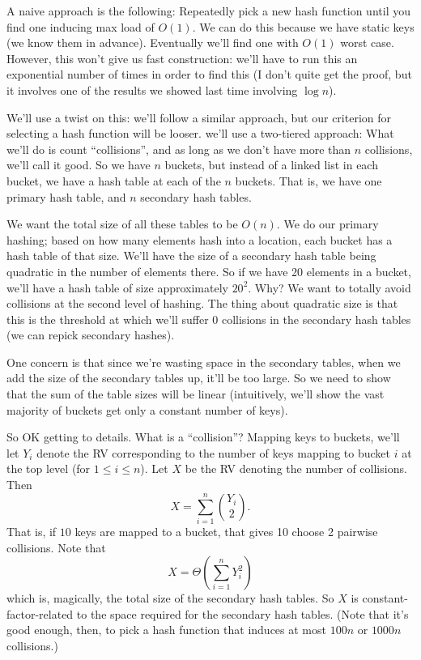 \documentclass{article}
\begin{document}
A naive approach is the following: Repeatedly pick a new hash function
until you find one inducing max load of $O(1)$.
We can do this because we have static keys (we know them in advance).
Eventually we'll find one with $O(1)$ worst case.
However, this won't give us fast construction:
we'll have to run this an exponential number of times in order to 
find this (I don't quite get the proof, but it involves one of the
results we showed last time involving $\log n$).

We'll use a twist on this: we'll follow a similar approach, but our
criterion for selecting a hash function will be looser.
we'll use a two-tiered approach: 
What we'll do is count ``collisions'', and as long as we don't have
more than $n$ collisions, we'll call it good.
So we have $n$ buckets, but instead of a linked list in each bucket,
we have a hash table at each of the $n$ buckets.
That is, we have one primary hash table, and $n$ secondary hash tables.

We want the total size of all these tables to be $O(n)$.
We do our primary hashing; based on how many elements hash into a location,
each bucket has a hash table of that size.
We'll have the size of a secondary hash table being quadratic in the number
of elements there.
So if we have 20 elements in a bucket, we'll have a hash table of size approximately $20^2$.
Why? 
We want to totally avoid collisions at the second level of hashing.
The thing about quadratic size is that this is the threshold at which we'll
suffer 0 collisions in the secondary hash tables (we can repick secondary
hashes).

One concern is that since we're wasting space in the secondary tables,
when we add the size of the secondary tables up, it'll be too large.
So we need to show that the sum of the table sizes will be linear
(intuitively, we'll show the vast majority of buckets get only a constant number
of keys).

So OK getting to details. What is a ``collision''?
Mapping keys to buckets, we'll let $Y_i$ denote the RV corresponding
to the number of keys mapping to bucket $i$ at the top level (for $1\leq i\leq n$).
Let $X$ be the RV denoting the number of collisions.
Then
$$
X = \sum_{i=1}^n {Y_i\choose 2}.
$$
That is, if $10$ keys are mapped to a bucket, that gives 10 choose 2 pairwise
collisions.
Note that
$$
X = \Theta\left(
	\sum_{i=1}^n Y_i^2
\right)
$$
which is, magically, the total size of the secondary hash tables.
So $X$ is constant-factor-related to the space required for the secondary
hash tables.
(Note that it's good enough, then, to pick a hash function that induces
at most $100n$ or $1000n$ collisions.)
\end{document}
